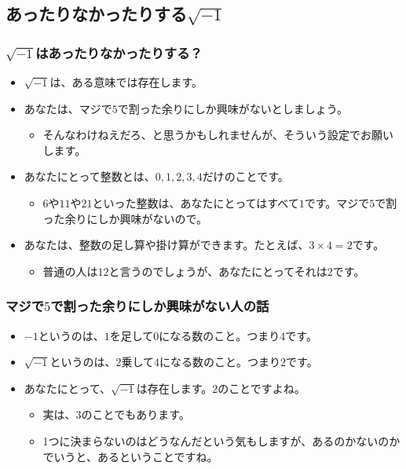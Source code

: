 \documentclass[dvipdfmx]{beamer}
\begin{document}
  \subsection{あったりなかったりする$\sqrt{-1}$}

  \begin{frame}
    \frametitle{$\sqrt{-1}$はあったりなかったりする？}

    \begin{itemize}
      \item $\sqrt{-1}$は、ある意味では存在します。
      \item あなたは、\alert{マジで$5$で割った余りにしか興味がない}としましょう。
      \begin{itemize}
        \item そんなわけねえだろ、と思うかもしれませんが、そういう設定でお願いします。
      \end{itemize}
      \item あなたにとって\alert{整数とは、$0, 1, 2, 3, 4$だけ}のことです。
      \begin{itemize}
        \item $6$や$11$や$21$といった整数は、あなたにとってはすべて$1$です。マジで$5$で割った余りにしか興味がないので。
      \end{itemize}
      \item あなたは、整数の足し算や掛け算ができます。たとえば、$3 \times 4 = 2$です。
      \begin{itemize}
        \item 普通の人は$12$と言うのでしょうが、あなたにとってそれは$2$です。
      \end{itemize}
    \end{itemize}

  \end{frame}

  \begin{frame}
    \frametitle{マジで$5$で割った余りにしか興味がない人の話}

    \begin{itemize}
      \item $-1$というのは、$1$を足して$0$になる数のこと。つまり$4$です。
      \item $\sqrt{-1}$というのは、$2$乗して$4$になる数のこと。つまり$2$です。
      \item あなたにとって、$\sqrt{-1}$は存在します。$2$のことですよね。
      \begin{itemize}
        \item 実は、$3$のことでもあります。
        \item 1つに決まらないのはどうなんだという気もしますが、あるのかないのかでいうと、あるということですね。
      \end{itemize}
    \end{itemize}

  \end{frame}
\end{document}
